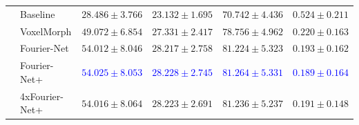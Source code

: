 \begin{table}[h]
\begin{tabularx}{\textwidth}{c Y Y Y Y Y}
		\midrule		
		 & Baseline & $28.486 \pm 3.766$ & $23.132 \pm 1.695$ & $70.742 \pm 4.436$ & $0.524 \pm 0.211$ \\  
		 & VoxelMorph & $49.072 \pm 6.854$ & $27.331 \pm 2.417$ & $78.756 \pm 4.962$ & $0.220 \pm 0.163$ \\ 
		 & Fourier-Net & $54.012 \pm 8.046$ & $28.217 \pm 2.758$ & $81.224 \pm 5.323$ & $0.193 \pm 0.162$ \\  
		 & Fourier-Net+ & \textcolor{blue}{$54.025 \pm 8.053$} & \textcolor{blue}{$28.228 \pm 2.745$} & \textcolor{blue}{$81.264 \pm 5.331$} & \textcolor{blue}{$0.189 \pm 0.164$} \\    
		 & \mbox{4xFourier-Net+} & $54.016 \pm 8.064$ & $28.223 \pm 2.691$ & $81.236 \pm 5.237$ & $0.191 \pm 0.148$ \\ 
		 \bottomrule
	\end{tabularx}
\end{table}

